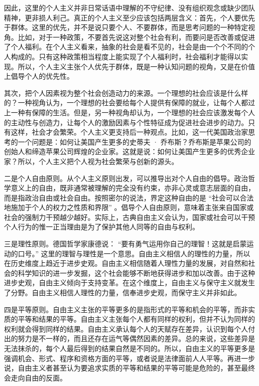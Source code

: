 因此，这里的个人主义并非日常话语中理解的不守纪律、没有组织观念或缺少团队精神，更非损人利己。真正的个人主义至少应该包括两层含义：首先，个人要优先于群体。这里的优先，并不是说只要个人、不要群体，而是思考问题的一种特定视角。比如，对于一种政策，不要首先说这对整个社会有利，而要问是否改善或促进了个人福利。在个人主义看来，抽象的社会是看不见的，社会是由一个个不同的个人构成的。只有这种政策相当程度上能实现了个人福利时，社会福利才能得以实现。所以，个人主义主张个人优先于群体，既是一种认知问题的视角，又是在价值上倡导个人的优先性。

其次，把个人因素视为整个社会创造动力的来源。一个理想的社会应该是什么样的？一种视角认为，一个理想的社会要给每个人提供有保障的就业，让每个人都过上一种有保障的生活。但是，另一种视角却认为，一个理想的社会应该激发每个人的主动性与创造力，让每个人的激励因素与个性特征成为促进社会进步的动力。只有这样，社会才会繁荣。个人主义更支持后一种观点。比如，这一代美国政治家思考的一个问题是：如何让美国产生更多的史蒂夫 · 乔布斯？乔布斯是苹果公司的创始人和缔造苹果公司辉煌的企业家。这就是说：如何让美国产生更多的优秀企业家？所以，个人主义把个人视为社会繁荣与创新的源头。

二是个人自由原则。从个人主义原则出发，可以推导出对个人自由的倡导。政治哲学意义上的自由，既非通常被理解的完全没有约束，亦非心灵或意志层面的自由，而是指政治自由或社会自由。按照密尔的说法，界定这种自由的是 “社会可以合法地施加于个人的权力之性质和界限” 。倡导个人自由原则，意味着主张来自国家或社会的强制力干预越少越好。实际上，古典自由主义会认为，国家或社会可以干预个人行为的惟一正当理由是为了保护其他人同等的自由与权利。

三是理性原则。德国哲学家康德说： “要有勇气运用你自己的理智！这就是启蒙运动的口号。” 这里的理智与理性是一个意思。自由主义相信人的理性的力量，所以在历史维度上趋近于进步史观。自由主义相信随着人理性力量的发展，对自然和社会的科学知识的进一步发掘，这个社会能够不断地获得进步和加以改善。由于这种进步史观，自由主义倾向于支持变革。在这个维度上，自由主义与保守主义就发生了分野。自由主义相信人理性的力量，信奉进步史观，而保守主义并非如此。

四是平等原则。自由主义主张的平等更多的是指形式的平等和机会的平等，而非实质的平等和结果的平等。自由主义主张每个人都有同样的权利，但并不认为同样的权利就会得到同样的结果。自由主义承认每个人的天赋存在差异，认识到每个人付出的努力是不一样的，而且还存在运气等偶然因素的差异。总的来说，这些差异是无法抹杀的，每个人最后得到的结果自然是不同的。所以，自由主义的平等更多是强调机会、形式、程序和资格方面的平等，或者说是法律面前人人平等。再进一步说，自由主义者甚至认为要追求实质的平等和结果的平等可能是危险的，甚至最终会走向自由的反面。

